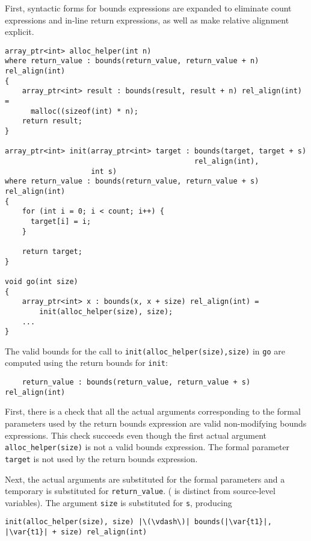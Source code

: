 First, syntactic forms for bounds expressions are expanded to eliminate
count expressions and in-line return expressions, as well as make
relative alignment explicit.

\begin{lstlisting}
array_ptr<int> alloc_helper(int n)
where return_value : bounds(return_value, return_value + n) rel_align(int)
{
    array_ptr<int> result : bounds(result, result + n) rel_align(int) =
      malloc((sizeof(int) * n);
    return result;
}

array_ptr<int> init(array_ptr<int> target : bounds(target, target + s)
                                            rel_align(int), 
                    int s) 
where return_value : bounds(return_value, return_value + s) rel_align(int)
{
    for (int i = 0; i < count; i++) {
      target[i] = i;
    }

    return target;
}

void go(int size) 
{
    array_ptr<int> x : bounds(x, x + size) rel_align(int) = 
        init(alloc_helper(size), size);
    ...
}
\end{lstlisting}

The valid bounds for the call to \lstinline|init(alloc_helper(size),size)| in
\lstinline|go| are computed using the return bounds for \lstinline|init|:

\begin{lstlisting}
    return_value : bounds(return_value, return_value + s) rel_align(int)
\end{lstlisting}

First, there is a check that all the actual arguments corresponding to
the formal parameters used by the return bounds expression are valid
non-modifying bounds expressions. This check succeeds even though the
first actual argument \lstinline|alloc_helper(size)| is not a valid bounds
expression. The formal parameter \lstinline|target| is not used by the
return bounds expression.

Next, the actual arguments are substituted for the formal parameters and
a temporary  is substituted for \lstinline|return_value|.
( is distinct from source-level variables).
The argument \lstinline|size| is substituted for \lstinline|s|, producing
\begin{lstlisting}[escapechar=\|]
    init(alloc_helper(size), size) |\(\vdash\)| bounds(|\var{t1}|, |\var{t1}| + size) rel_align(int)
\end{lstlisting}

